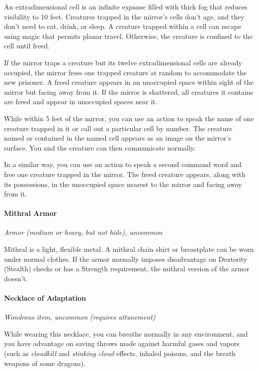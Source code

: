 \documentclass[
]{article}
\begin{document}
An extradimensional cell is an infinite expanse filled with thick fog
that reduces visibility to 10 feet. Creatures trapped in the mirror's
cells don't age, and they don't need to eat, drink, or sleep. A creature
trapped within a cell can escape using magic that permits planar travel.
Otherwise, the creature is confined to the cell until freed.

If the mirror traps a creature but its twelve extradimensional cells are
already occupied, the mirror frees one trapped creature at random to
accommodate the new prisoner. A freed creature appears in an unoccupied
space within sight of the mirror but facing away from it. If the mirror
is shattered, all creatures it contains are freed and appear in
unoccupied spaces near it.

While within 5 feet of the mirror, you can use an action to speak the
name of one creature trapped in it or call out a particular cell by
number. The creature named or contained in the named cell appears as an
image on the mirror's surface. You and the creature can then communicate
normally.

In a similar way, you can use an action to speak a second command word
and free one creature trapped in the mirror. The freed creature appears,
along with its possessions, in the unoccupied space nearest to the
mirror and facing away from it.

\hypertarget{mithral-armor}{%
\paragraph{Mithral Armor}\label{mithral-armor}}

\emph{Armor (medium or heavy, but not hide), uncommon}

Mithral is a light, flexible metal. A mithral chain shirt or breastplate
can be worn under normal clothes. If the armor normally imposes
disadvantage on Dexterity (Stealth) checks or has a Strength
requirement, the mithral version of the armor doesn't.

\hypertarget{necklace-of-adaptation}{%
\paragraph{Necklace of Adaptation}\label{necklace-of-adaptation}}

\emph{Wondrous item, uncommon (requires attunement)}

While wearing this necklace, you can breathe normally in any
environment, and you have advantage on saving throws made against
harmful gases and vapors (such as \emph{cloudkill} and \emph{stinking
cloud} effects, inhaled poisons, and the breath weapons of some
dragons).
\end{document}
